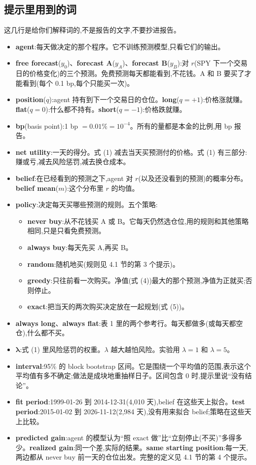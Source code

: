 \documentclass{article}
\newenvironment{pts}{\begin{itemize}[nosep,leftmargin=1.15em,topsep=1pt]}{\end{itemize}}
\begin{document}
\subsection*{提示里用到的词}
这几行是给你们解释词的,不是报告的文字,不要抄进报告。
\begin{pts}
\item \textbf{agent}:每天做决定的那个程序。它不训练预测模型,只看它们的输出。
\item \textbf{free forecast}($y_0$)、\textbf{forecast A}($y_A$)、\textbf{forecast B}($y_B$):对 $r$(SPY 下一个交易日的价格变化)的三个预测。免费预测每天都能看到,不花钱。A 和 B 要买了才能看到(每个 0.1 bp,每个只能买一次)。
\item \textbf{position}($q$):agent 持有到下一个交易日的仓位。\textbf{long}($q=+1$):价格涨就赚。\textbf{flat}($q=0$):什么都不持有。\textbf{short}($q=-1$):价格跌就赚。
\item \textbf{bp}(basis point):1 bp $= 0.01\% = 10^{-4}$。所有的量都是本金的比例,用 bp 报告。
\item \textbf{net utility}:一天的得分。式 (1) 减去当天买预测付的价格。式 (1) 有三部分:赚或亏,减去风险惩罚,减去换仓成本。
\item \textbf{belief}:在已经看到的预测之下,agent 对 $r$(以及还没看到的预测)的概率分布。\textbf{belief mean}($m$):这个分布里 $r$ 的均值。
\item \textbf{policy}:决定每天买哪些预测的规则。五个策略:
  \begin{itemize}[nosep,leftmargin=1.15em,topsep=0pt]
  \item \textbf{never buy}:从不花钱买 A 或 B。它每天仍然选仓位,用的规则和其他策略相同,只是只看免费预测。
  \item \textbf{always buy}:每天先买 A,再买 B。
  \item \textbf{random}:随机地买(规则见 4.1 节的第 3 个提示)。
  \item \textbf{greedy}:只往前看一次购买。净值(式 (4))最大的那个预测,净值为正就买;否则停止。
  \item \textbf{exact}:把当天的两次购买决定放在一起规划(式 (5))。
  \end{itemize}
\item \textbf{always long}、\textbf{always flat}:表 1 里的两个参考行。每天都做多(或每天都空仓),什么都不买。
\item $\boldsymbol{\lambda}$:式 (1) 里风险惩罚的权重。$\lambda$ 越大越怕风险。实验用 $\lambda=1$ 和 $\lambda=5$。
\item \textbf{interval}:95\% 的 block bootstrap 区间。它是围绕一个平均值的范围,表示这个平均值有多不确定;做法是成块地重抽样日子。区间包含 0 时,提示里说``没有结论''。
\item \textbf{fit period}:1999-01-26 到 2014-12-31(4{,}010 天),belief 在这些天上拟合。\textbf{test period}:2015-01-02 到 2026-11-12(2{,}984 天),没有用来拟合 belief;策略在这些天上比较。
\item \textbf{predicted gain}:agent 的模型认为``照 exact 做''比``立刻停止(不买)''多得多少。\textbf{realized gain}:同一个差,实际的结果。\textbf{same starting position}:每一天,两边都从 never buy 前一天的仓位出发。完整的定义见 4.1 节的第 4 个提示。
\end{pts}
\end{document}
